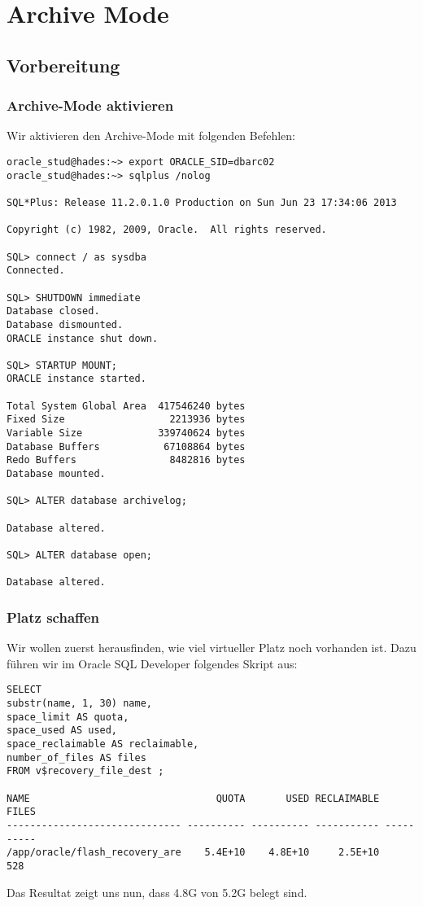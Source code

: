 \documentclass[11pt,a4paper,parskip=half]{scrartcl}
\begin{document}
\section{Archive Mode}
\subsection{Vorbereitung}
\subsubsection{Archive-Mode aktivieren}
Wir aktivieren den Archive-Mode mit folgenden Befehlen:
\begin{lstlisting}
oracle_stud@hades:~> export ORACLE_SID=dbarc02
oracle_stud@hades:~> sqlplus /nolog

SQL*Plus: Release 11.2.0.1.0 Production on Sun Jun 23 17:34:06 2013

Copyright (c) 1982, 2009, Oracle.  All rights reserved.

SQL> connect / as sysdba
Connected.

SQL> SHUTDOWN immediate
Database closed.
Database dismounted.
ORACLE instance shut down.

SQL> STARTUP MOUNT;
ORACLE instance started.

Total System Global Area  417546240 bytes
Fixed Size                  2213936 bytes
Variable Size             339740624 bytes
Database Buffers           67108864 bytes
Redo Buffers                8482816 bytes
Database mounted.

SQL> ALTER database archivelog;

Database altered.

SQL> ALTER database open;

Database altered.
\end{lstlisting}
\subsubsection{Platz schaffen}
Wir wollen zuerst herausfinden, wie viel virtueller Platz noch vorhanden ist. Dazu führen wir im Oracle SQL Developer folgendes Skript aus:
\begin{lstlisting}
SELECT
substr(name, 1, 30) name,
space_limit AS quota,
space_used AS used,
space_reclaimable AS reclaimable,
number_of_files AS files
FROM v$recovery_file_dest ;

NAME                                QUOTA       USED RECLAIMABLE      FILES
------------------------------ ---------- ---------- ----------- ----------
/app/oracle/flash_recovery_are    5.4E+10    4.8E+10     2.5E+10        528 
\end{lstlisting}
Das Resultat zeigt uns nun, dass 4.8G von 5.2G belegt sind.
\end{document}

